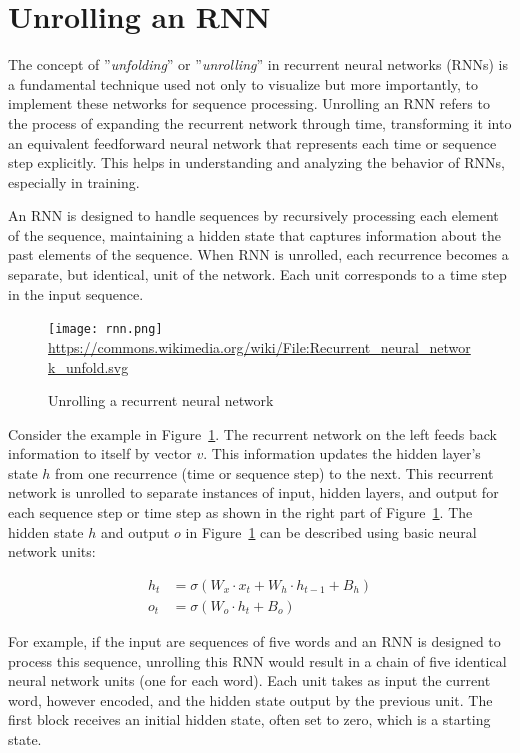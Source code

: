 \section{Unrolling an RNN}

The concept of ''\emph{unfolding}'' or ''\emph{unrolling}'' in recurrent neural networks (RNNs) is a fundamental technique used not only to visualize but more importantly, to implement these networks for sequence processing. Unrolling an RNN refers to the process of expanding the recurrent network through time, transforming it into an equivalent feedforward neural network that represents each time or sequence step explicitly. This helps in understanding and analyzing the behavior of RNNs, especially in training.

An RNN is designed to handle sequences by recursively processing each element of the sequence, maintaining a hidden state that captures information about the past elements of the sequence. When RNN is unrolled, each recurrence becomes a separate, but identical, unit of the network. Each unit corresponds to a time step in the input sequence.

\begin{figure}
\centering
\texttt{[image: rnn.png]}
\scriptsize \url{https://commons.wikimedia.org/wiki/File:Recurrent_neural_network_unfold.svg}
\caption{Unrolling a recurrent neural network}
\label{fig:unrolling}
\end{figure}

Consider the example in Figure~\ref{fig:unrolling}. The recurrent network on the left feeds back information to itself by vector $v$. This information updates the hidden layer's state $h$ from one recurrence (time or sequence step) to the next. This recurrent network is unrolled to separate instances of input, hidden layers, and output for each sequence step or time step as shown in the right part of Figure~\ref{fig:unrolling}. The hidden state $h$ and output $o$ in Figure~\ref{fig:unrolling} can be described using basic neural network units:

\begin{align}
h_t &= \sigma ( W_{x} \cdot x_t + W_{h} \cdot h_{t-1} + B_{h}) \label{eq:rnn1} \\
o_t &= \sigma (W_{o} \cdot h_t + B_{o} ) \label{eq:rnn2} 
\end{align}

For example, if the input are sequences of five words and an RNN is designed to process this sequence, unrolling this RNN would result in a chain of five identical neural network units (one for each word). Each unit takes as input the current word, however encoded, and the hidden state output by the previous unit. The first block receives an initial hidden state, often set to zero, which is a starting state.


